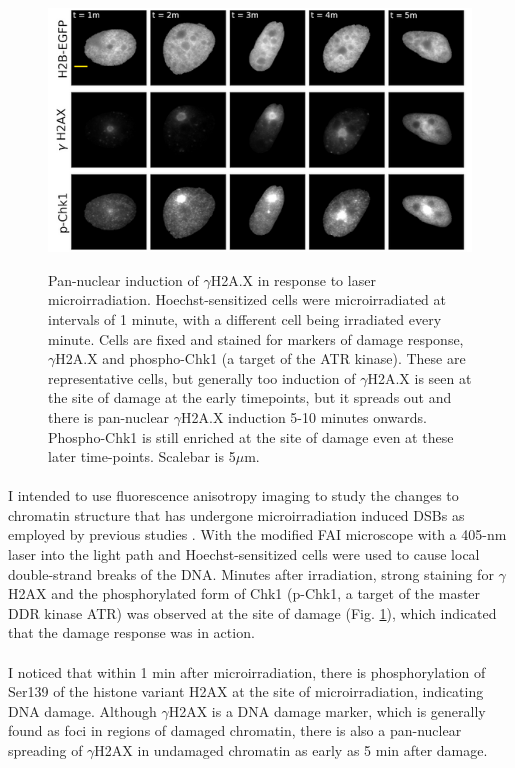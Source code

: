 \begin{figure}[!htp]
    {\hfill\includegraphics[clip,width=1\linewidth]{figures/pchk1.png}\hspace*{\fill}}
    \caption{Pan-nuclear induction of $\gamma$H2A.X in response to laser microirradiation. Hoechst-sensitized cells were microirradiated at intervals of 1 minute, with a different cell being irradiated every minute. Cells are fixed and stained for markers of damage response, $\gamma$H2A.X and phospho-Chk1 (a target of the ATR kinase). These are representative cells, but generally too induction of $\gamma$H2A.X is seen at the site of damage at the early timepoints, but it spreads out and there is pan-nuclear $\gamma$H2A.X induction 5-10 minutes onwards. Phospho-Chk1 is still enriched at the site of damage even at these later time-points. Scalebar is 5$\mu$m.}
    {\label{fig:chk1}}
\end{figure}


\paragraph*{} I intended to use fluorescence anisotropy imaging to study the changes to chromatin structure that has undergone microirradiation induced DSBs as employed by previous studies \cite{kruhlak2006changes, BURGESS20141703,strickfaden2016poly}. With the modified FAI microscope with a 405-nm laser into the light path and Hoechst-sensitized cells were used to cause local double-strand breaks of the DNA. Minutes after irradiation, strong staining for $\gamma$H2AX and the phosphorylated form of Chk1 (p-Chk1, a target of the master DDR kinase ATR) was observed at the site of damage (Fig. {\ref{fig:chk1}}), which indicated that the damage response was in action. 


\paragraph*{} I noticed that within 1 min after microirradiation, there is phosphorylation of Ser139 of the histone variant H2AX at the site of microirradiation, indicating DNA damage. Although $\gamma$H2AX is a DNA damage marker, which is generally found as foci in regions of damaged chromatin, there is also a pan-nuclear spreading of $\gamma$H2AX in undamaged chromatin as early as 5 min after damage. 

